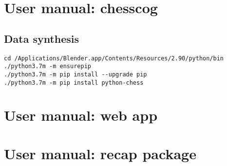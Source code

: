 \documentclass[../../main.tex]{subfiles}
\begin{document}
\chapter{User manual: chesscog}

\section{Data synthesis}
\begin{verbatim}
cd /Applications/Blender.app/Contents/Resources/2.90/python/bin
./python3.7m -m ensurepip
./python3.7m -m pip install --upgrade pip
./python3.7m -m pip install python-chess
\end{verbatim}

\chapter{User manual: web app}
\chapter{User manual: recap package}
\end{document}
